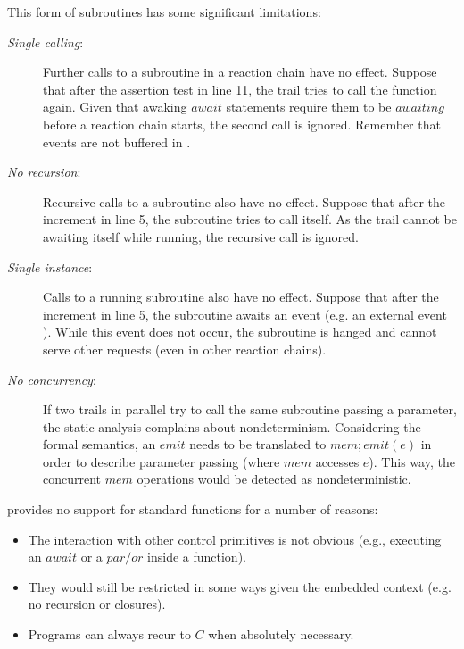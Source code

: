 This form of subroutines has some significant limitations:

\begin{description}
\item[\emph{Single calling}:] Further calls to a subroutine in a reaction chain 
have no effect.
Suppose that after the assertion test in line 11, the trail tries to call the 
function again.
Given that awaking $await$ statements require them to be $awaiting$ before a 
reaction chain starts, the second call is ignored.
Remember that events are not buffered in \CEU.

\item[\emph{No recursion}:] Recursive calls to a subroutine also have no 
effect.
Suppose that after the increment in line 5, the subroutine tries to call 
itself.
As the trail cannot be awaiting itself while running, the recursive call is 
ignored.

\item[\emph{Single instance}:] Calls to a running subroutine also have no 
effect.
Suppose that after the increment in line 5, the subroutine awaits an event 
(e.g. an external event ).
While this event does not occur, the subroutine is hanged and cannot serve 
other requests (even in other reaction chains).

\item[\emph{No concurrency}:] If two trails in parallel try to call the same 
subroutine passing a parameter, the static analysis complains about 
nondeterminism.
Considering the formal semantics, an $emit$ needs to be translated to 
$mem;emit(e)$ in order to describe parameter passing (where $mem$ accesses 
$e$).
This way, the concurrent $mem$ operations would be detected as 
nondeterministic.
\end{description}

\vspace{5pt}
\CEU provides no support for standard functions for a number of reasons:
\begin{itemize}
\item The interaction with other \CEU control primitives is not obvious (e.g., 
executing an $await$ or a $par/or$ inside a function).
\item They would still be restricted in some ways given the embedded context 
(e.g.  no recursion or closures).
\item Programs can always recur to $C$ when absolutely necessary.
\end{itemize}

